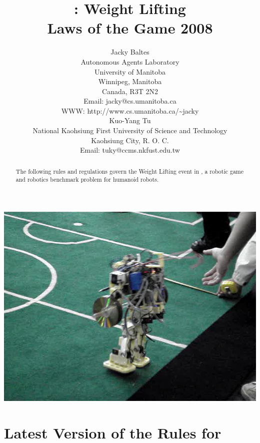\documentclass[12pt]{hurocup}
\begin{document}
\title{\HuroCup: Weight Lifting\\
  Laws of the Game 2008}


\author{Jacky Baltes\\
Autonomous Agents Laboratory\\
University of Manitoba\\
Winnipeg, Manitoba\\
Canada, R3T 2N2\\
Email: jacky@cs.umanitoba.ca\\
WWW: http://www.cs.umanitoba.ca/\~{ }jacky\\[5mm]
Kuo-Yang Tu\\
National Kaohsiung First University of Science and Technology\\
Kaohsiung City, R. O. C.\\
Email: tuky@ccms.nkfust.edu.tw\\
}

\maketitle

\begin{center}
 \includegraphics[width=0.7\linewidth]{Figures/weight-lifting-life}
\end{center}

\begin{abstract}
The following rules and regulations govern the Weight Lifting event in
\HuroCup, a robotic game and robotics benchmark problem for humanoid
robots.
%
\end{abstract}

\section*{Latest Version of the Rules for \HuroCup}
\label{sec:updates}
\end{document}
